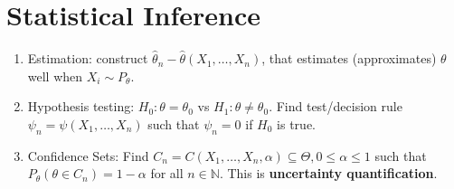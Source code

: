 \section{Statistical Inference}
\label{sec:stat-infer}

\begin{enumerate}
\item Estimation: construct $\hat{\theta}_{n} - \hat{\theta}(X_{1},
  \dots, X_{n})$, that estimates (approximates) $\theta$ well when
  $X_{i} \sim P_{\theta}$.
\item Hypothesis testing: $H_{0}: \theta = \theta_{0}$ vs $H_{1}:
  \theta \neq \theta_{0}$.  Find test/decision rule $\psi_{n} =
  \psi(X_{1}, \dots, X_{n})$ such that $\psi_{n} = 0$ if $H_{0}$ is true.
\item Confidence Sets: Find $C_{n} = C(X_{1}, \dots, X_{n}, \alpha)
  \subseteq \Theta, 0 \leq \alpha \leq 1$ such that $P_{\theta}(\theta
  \in C_{n}) = 1-\alpha$ for all $n \in \mathbb{N}$.
  This is \textbf{uncertainty quantification}.
\end{enumerate}

